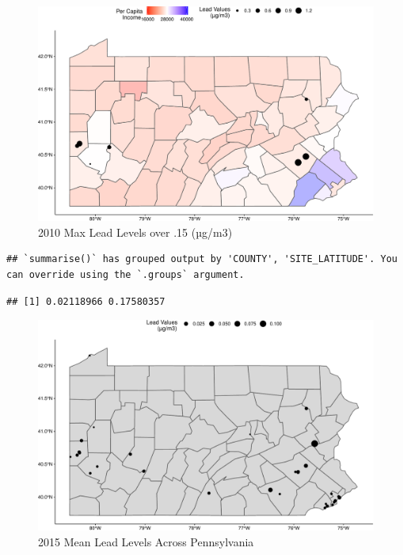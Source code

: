 \documentclass[
  12pt,
]{article}
\begin{document}
\begin{figure}

\includegraphics{Alcorn_Bao_Hermanson_ENV872_Project_files/figure-latex/spatial-analysis 2010.3-1} \hfill{}

\caption{2010 Max Lead Levels over .15 (µg/m3)}\label{fig:spatial-analysis 2010.3}
\end{figure}

\begin{verbatim}
## `summarise()` has grouped output by 'COUNTY', 'SITE_LATITUDE'. You can override using the `.groups` argument.
\end{verbatim}

\begin{verbatim}
## [1] 0.02118966 0.17580357
\end{verbatim}

\begin{figure}

\includegraphics{Alcorn_Bao_Hermanson_ENV872_Project_files/figure-latex/spatial analysis 2015.4-1} \hfill{}

\caption{2015 Mean Lead Levels Across Pennsylvania}\label{fig:spatial analysis 2015.4}
\end{figure}
\end{document}
